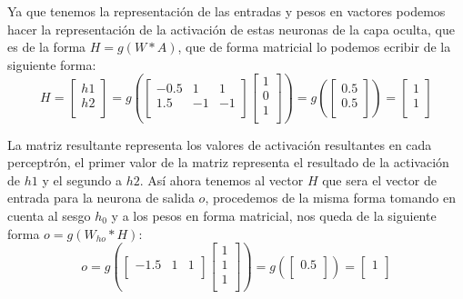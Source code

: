  Ya que tenemos la representación de las entradas y pesos en vactores podemos hacer la representación de la activación de estas neuronas de la capa oculta, que es de la forma $H = g(W * A)$, que de forma matricial lo podemos ecribir de la siguiente forma:
 $$
 H=
 \begin{bmatrix}
  h{1}  \\
  h{2}\\
 \end{bmatrix}
 = g \left(
 \begin{bmatrix}
  -0.5 & 1 & 1\\
  1.5 & -1 & -1\\
 \end{bmatrix}
 \begin{bmatrix}
  1 \\
  0 \\
  1 \\
 \end{bmatrix}
 \right) = g \left(
 \begin{bmatrix}
  0.5 \\
  0.5 \\
 \end{bmatrix}
\right) =
 \begin{bmatrix}
  1 \\
  1 \\
 \end{bmatrix}
$$
 
 La matriz resultante representa los valores de activación resultantes en cada perceptrón, el primer valor de la matriz representa el resultado de la activación de $h1$ y el segundo a $h2$. Así ahora tenemos al vector $H$ que sera el vector de entrada para la neurona de salida $o$, procedemos de la misma forma tomando en cuenta al sesgo $h_0$ y a los pesos en forma matricial, nos queda de la siguiente forma $o = g(W_{ho} * H)$:
 $$
 o =
 g \left(
 \begin{bmatrix}
  -1.5 & 1 & 1\\
 \end{bmatrix}
 \begin{bmatrix}
  1 \\
  1 \\
  1 \\
 \end{bmatrix}
 \right) = g \left(
 \begin{bmatrix}
  0.5 \\
 \end{bmatrix}
\right) =
 \begin{bmatrix}
  1 \\
 \end{bmatrix}
 $$
 

